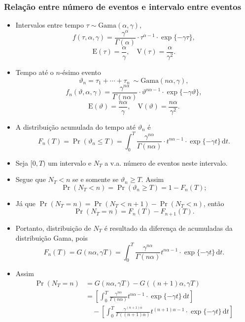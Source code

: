 \documentclass[10pt, aspectratio=169]{beamer}\usepackage[]{graphicx}\usepackage[]{color}
\begin{document}
\begin{frame}[allowframebreaks]
  \frametitle{Relação entre número de eventos e intervalo entre eventos}
  \begin{itemize}
  \item Intervalos entre tempo $\tau \sim \text{Gama}(\alpha,\gamma)$,
    $$f(\tau, \alpha, \gamma) = \frac{\gamma^\alpha}{\Gamma(\alpha)}
    \cdot \tau^{\alpha-1}\cdot \exp\{-\gamma\tau\},$$
    $$ \text{E}(\tau) = \frac{\alpha}{\gamma}, \quad
    \text{V}(\tau) = \frac{\alpha}{\gamma^2}.$$
  \item Tempo até o $n$-ésimo evento
    $$\vartheta_n = \tau_1+\cdots+\tau_n ~ \sim
    \text{Gama}(n\alpha, \gamma),$$
    $$f_n(\vartheta, \alpha, \gamma) =
    \frac{\gamma^{n\alpha}}{\Gamma(n\alpha)}\cdot
    \vartheta^{n\alpha-1}\cdot \exp\{-\gamma\vartheta\},$$
    $$ \text{E}(\vartheta) = \frac{n\alpha}{\gamma}, \quad
    \text{V}(\vartheta) = \frac{n\alpha}{\gamma^2}.$$

    \framebreak

  \item A distribuição acumulada do tempo até $\vartheta_{n}$ é
    $$F_n(T) = \Pr(\vartheta_n \leq T) = \int_{0}^{T}
    \frac{\gamma^{n\alpha}}{\Gamma(n\alpha)}\cdot t^{n\alpha-1}\cdot
    \exp\{-\gamma t\}\,\text{d}t.$$
  \item Seja $[0,T)$ um intervalo e $N_{T}$ a v.a. número de eventos
    neste intervalo.
  \item Segue que $N_T < n$ se e somente se $\vartheta_n \geq
    T$. Assim
    $$\Pr(N_T<n) = \Pr(\vartheta_n \geq T) = 1-F_n(T);$$
  \item Já que $\Pr(N_T = n) = \Pr(N_T < n+1) - \Pr(N_T < n)$, então
    $$\Pr(N_T = n) = F_n(T) - F_{n+1}(T).$$

    \framebreak

  \item Portanto, distribuição de $N_T$ é resultado da diferença de
    acumuladas da distribuição Gama, pois
    \begin{equation}
      F_n(T) = G(n\alpha, \gamma T) =
      \int_{0}^{T} \frac{\gamma^{n\alpha}}{\Gamma(n\alpha)}
      t^{n\alpha-1}\cdot\exp\{-\gamma t\}\, \text{d}t.
    \end{equation}
  \item Assim
    \begin{align*}
      \Pr(N_T=n) &= G(n\alpha, \gamma T) - G((n+1)\alpha, \gamma T) \\
                 &= \left[ \int_{0}^{T}
                   \frac{\gamma^{n\alpha}}{\Gamma(n\alpha)}
                   t^{n\alpha-1}\cdot
                   \exp\{-\gamma t\}\, \text{d}t \right] \\
                 &\quad -
                   \left[ \int_{0}^{T}
                   \frac{\gamma^{(n+1)\alpha}}{\Gamma((n+1)\alpha)}
                   t^{(n+1)\alpha-1}\cdot
                   \exp\{-\gamma t\}\, \text{d}t \right]
    \end{align*}
  \end{itemize}
\end{frame}
\end{document}
